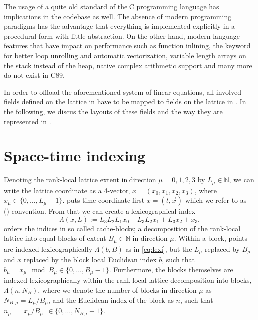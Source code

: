 The usage of a quite old standard of the C programming language has implications in the codebase as well. The absence of modern programming paradigms has the advantage that everything is implemented explicitly in a procedural form with little abstraction. On the other hand, modern language features that have impact on performance such as function inlining, the  keyword for better loop unrolling and automatic vectorization, variable length arrays on the stack instead of the heap, native complex arithmetic support and many more do not exist in C89.

In order to offload the aforementioned system of linear equations, all involved fields defined on the lattice in \openqxd have to be mapped to fields on the lattice in \quda.
In the following, we discus the layouts of these fields and the way they are represented in \openqxd.

\section{Space-time indexing}
\label{sec:openqxd:index}

Denoting the rank-local lattice extent in direction $\mu=0,1,2,3$ by $L_\mu \in \mathbb{N}$, we can write the lattice coordinate as a 4-vector, $x = (x_0,x_1,x_2,x_3)$, where $x_\mu \in \{ 0, \dots, L_\mu -1 \}$. \Openqxd puts time coordinate first $x = (t, \vec{x})$ which we refer to as (\txyz)-convention. From that we can create a lexicographical index
\begin{equation} \label{eq:lexi}
\Lambda(x, L) := L_3 L_2 L_1 x_0 + L_3 L_2 x_1 + L_3 x_2 + x_3.
\end{equation}
\Openqxd orders the indices in so called cache-blocks; a decomposition of the rank-local lattice into equal blocks of extent $B_\mu \in \mathbb{N}$ in direction $\mu$. Within a block, points are indexed lexicographically $\Lambda(b, B)$ as in \cref{eq:lexi}, but the $L_\mu$ replaced by $B_\mu$ and $x$ replaced by the block local Euclidean index $b$, such that $b_\mu = x_\mu \mod B_\mu \in \{ 0, \dots, B_\mu -1 \}$.
Furthermore, the blocks themselves are indexed lexicographically within the rank-local lattice decomposition into blocks, \ie $\Lambda(n, N_B)$, where we denote the number of blocks in direction $\mu$ as $N_{B,\mu} = L_\mu / B_\mu$, and the Euclidean index of the block as $n$, such that $n_\mu = \lfloor x_\mu / B_\mu \rfloor \in \{ 0, \dots, N_{B,i} -1 \}$.

